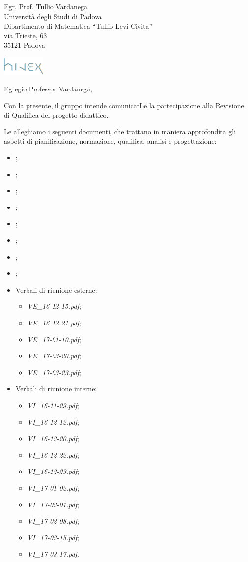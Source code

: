 \documentclass[a4paper]{letter} %
\date{Padova, \today}
\begin{document}
\begin{letter}{Egr. Prof. Tullio Vardanega\\
Università degli Studi di Padova\\
Dipartimento di Matematica “Tullio Levi-Civita”\\
via Trieste, 63\\
35121 Padova}

\includegraphics[width=80px]{../../util/hivex_logo3.png}

\opening{Egregio Professor Vardanega,}

Con la presente, il gruppo \hx{} intende comunicarLe la partecipazione alla Revisione di Qualifica del progetto didattico.

Le alleghiamo i seguenti documenti, che trattano in maniera approfondita gli aspetti di pianificazione, normazione, qualifica, analisi e progettazione:
\begin{itemize}
	\item \NdP;
	\item \PdP;
	\item \PdQ;
	\item \AdR;
	\item \ST;
	\item \DP;
	\item \Glossario;
	\item \MU;
	\item Verbali di riunione esterne:
	\begin{itemize}
		\item \emph{VE\_16-12-15.pdf};
		\item \emph{VE\_16-12-21.pdf};
		\item \emph{VE\_17-01-10.pdf};
		\item \emph{VE\_17-03-20.pdf};
		\item \emph{VE\_17-03-23.pdf};
	\end{itemize}
	\item Verbali di riunione interne:
	\begin{itemize}
		\item \emph{VI\_16-11-29.pdf};
		\item \emph{VI\_16-12-12.pdf};
		\item \emph{VI\_16-12-20.pdf};
		\item \emph{VI\_16-12-22.pdf};
		\item \emph{VI\_16-12-23.pdf};
		\item \emph{VI\_17-01-02.pdf};
		\item \emph{VI\_17-02-01.pdf};
		\item \emph{VI\_17-02-08.pdf};
		\item \emph{VI\_17-02-15.pdf};
		\item \emph{VI\_17-03-17.pdf}.
	\end{itemize}
\end{itemize}


\end{letter}
\end{document}
